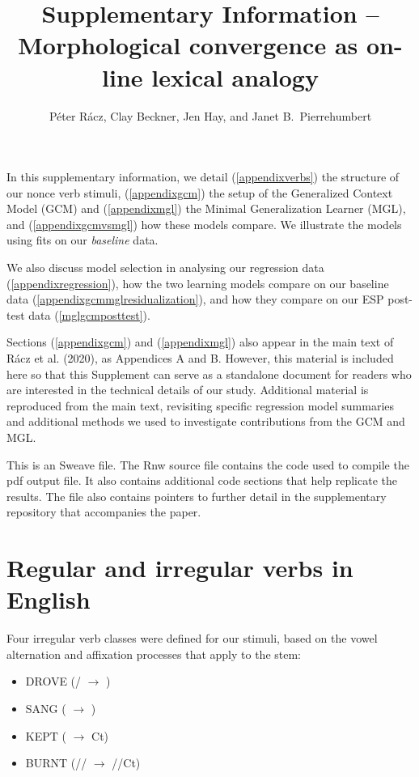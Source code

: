 \documentclass[12pt]{article}
\title{Supplementary Information -- Morphological convergence as on-line lexical analogy}
\author{P\'eter R\'acz, Clay Beckner, Jen Hay, and Janet B.\ Pierrehumbert}
\begin{document}



\maketitle

\noindent In this supplementary information, we detail (\ref{appendixverbs}) the structure of our nonce verb stimuli, (\ref{appendixgcm}) the setup of the Generalized Context Model (GCM) and (\ref{appendixmgl}) the Minimal Generalization Learner (MGL), and (\ref{appendixgcmvsmgl}) how these models compare. We illustrate the models using fits on our \emph {baseline} data. 

We also discuss model selection in analysing our regression data (\ref{appendixregression}), how the two learning models compare on our baseline data (\ref{appendixgcmmglresidualization}), and how they compare on our ESP post-test data (\ref{mglgcmposttest}). 

Sections (\ref{appendixgcm}) and (\ref{appendixmgl}) also appear in the main text of  R\'acz et al. (2020), as Appendices A and B. However, this material is included here so that this Supplement can serve as a standalone document for readers who are interested in the technical details of our study. Additional material is reproduced from the main text, revisiting specific regression model summaries and additional methods we used to investigate contributions from the GCM and MGL.

This is an Sweave file. The Rnw source file contains the code used to compile the pdf output file. It also contains additional code sections that help replicate the results. The file also contains pointers to further detail in the supplementary repository that accompanies the paper. 

\section{Regular and irregular verbs in English \label{appendixverbs}}

Four irregular verb classes were defined for our stimuli, based on the vowel alternation and affixation processes that apply to the stem:

\begin{itemize}
    \item DROVE (\textipa{[aI]}/\textipa{[i]} $\rightarrow{}$ \textipa{[oU]})
    \item SANG (\textipa{[I]} $\rightarrow{}$ \textipa{[\ae]})
    \item KEPT (\textipa{[i]} $\rightarrow{}$ \textipa{[E]}Ct)
    \item BURNT (\textipa{[3]}/\textipa{[E]}/\textipa{[I]} $\rightarrow{}$ \textipa{[3]}/\textipa{[E]}/\textipa{[I]}Ct)
\end{itemize}
\end{document}
